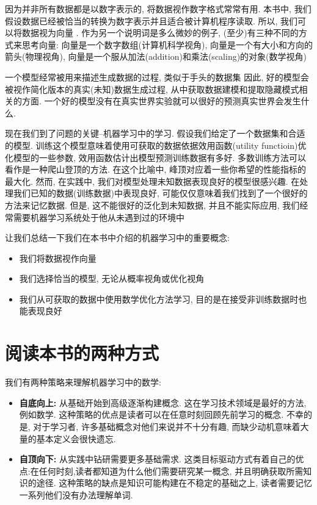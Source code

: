 因为并非所有数据都是以数字表示的, 将数据视作数字格式常常有用.
本书中, 我们假设数据已经被恰当的转换为数字表示并且适合被计算机程序读取.
所以, 我们可以将数据视为向量 .
作为另一个说明词是多么微妙的例子, (至少)有三种不同的方式来思考向量:
向量是一个数字数组(计算机科学视角),
向量是一个有大小和方向的箭头(物理视角),
向量是一个服从加法(addition)和乘法(scaling)的对象(数学视角)

一个模型经常被用来描述生成数据的过程, 类似于手头的数据集
因此, 好的模型会被视作简化版本的真实(未知)数据生成过程, 从中获取数据建模和提取隐藏模式相关的方面.
一个好的模型没有在真实世界实验就可以很好的预测真实世界会发生什么.

现在我们到了问题的关键--机器学习中的学习.
假设我们给定了一个数据集和合适的模型.
训练这个模型意味着使用可获取的数据依据效用函数(utility functioin)优化模型的一些参数,
效用函数估计出模型预测训练数据有多好.
多数训练方法可以看作是一种爬山登顶的方法.
在这个比喻中, 峰顶对应着一些你希望的性能指标的最大化.
然而, 在实践中, 我们对模型处理未知数据表现良好的模型很感兴趣.
在处理我们已知的数据(训练数据)中表现良好, 可能仅仅意味着我们找到了一个很好的方法来记忆数据.
但是, 这不能很好的泛化到未知数据, 并且不能实际应用, 我们经常需要机器学习系统处于他从未遇到过的环境中

让我们总结一下我们在本书中介绍的机器学习中的重要概念:

\begin{itemize}
	\item 我们将数据视作向量
	\item 我们选择恰当的模型, 无论从概率视角或优化视角
	\item 我们从可获取的数据中使用数学优化方法学习, 目的是在接受非训练数据时也能表现良好
\end{itemize}

\section{阅读本书的两种方式}

我们有两种策略来理解机器学习中的数学:

\begin{itemize}
	\item \textbf{自底向上:} 
	从基础开始到高级逐渐构建概念. 这在学习技术领域是最好的方法, 例如数学.
	这种策略的优点是读者可以在任意时刻回顾先前学习的概念.
	不幸的是, 对于学习者, 许多基础概念对他们来说并不十分有趣, 而缺少动机意味着大量的基本定义会很快遗忘.
	\item \textbf{自顶向下:}
	从实践中钻研需要更多基础需求.
	这类目标驱动方式有着自己的优点:在任何时刻,读者都知道为什么他们需要研究某一概念, 并且明确获取所需知识的途径.
	这种策略的缺点是知识可能构建在不稳定的基础之上, 读者需要记忆一系列他们没有办法理解单词.
\end{itemize}

